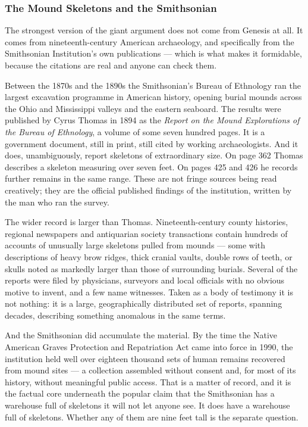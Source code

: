 \subsubsection{The Mound Skeletons and the Smithsonian}\label{sec:moundgiants}

The strongest version of the giant argument does not come from Genesis at all. It comes from
nineteenth-century American archaeology, and specifically from the Smithsonian Institution's
own publications --- which is what makes it formidable, because the citations are real and
anyone can check them.

Between the 1870s and the 1890s the Smithsonian's Bureau of Ethnology ran the largest
excavation programme in American history, opening burial mounds across the Ohio and Mississippi
valleys and the eastern seaboard. The results were published by Cyrus Thomas in 1894 as the
\emph{Report on the Mound Explorations of the Bureau of Ethnology}, a volume of some seven
hundred pages. It is a government document, still in print, still cited by working
archaeologists. And it does, unambiguously, report skeletons of extraordinary size. On page 362
Thomas describes a skeleton measuring over seven feet. On pages 425 and 426 he records further
remains in the same range. These are not fringe sources being read creatively; they are the
official published findings of the institution, written by the man who ran the survey.

The wider record is larger than Thomas. Nineteenth-century county histories, regional
newspapers and antiquarian society transactions contain hundreds of accounts of unusually
large skeletons pulled from mounds --- some with descriptions of heavy brow ridges,
thick cranial vaults, double rows of teeth, or skulls noted as markedly larger than those of
surrounding burials. Several of the reports were filed by physicians, surveyors and local
officials with no obvious motive to invent, and a few name witnesses. Taken as a body of
testimony it is not nothing: it is a large, geographically distributed set of reports,
spanning decades, describing something anomalous in the same terms.

And the Smithsonian did accumulate the material. By the time the Native American Graves
Protection and Repatriation Act came into force in 1990, the institution held well over
eighteen thousand sets of human remains recovered from mound sites --- a collection assembled
without consent and, for most of its history, without meaningful public access. That is a
matter of record, and it is the factual core underneath the popular claim that the Smithsonian
has a warehouse full of skeletons it will not let anyone see. It does have a warehouse full of
skeletons. Whether any of them are nine feet tall is the separate question.

